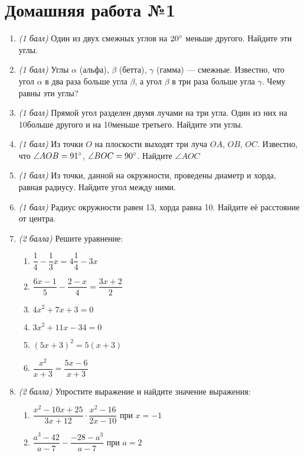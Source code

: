 \documentclass[12pt, a4paper]{article}
\begin{document}
		

\section*{Домашняя работа №1}
\begin{enumerate}
	\item \textit{(1 балл)} Один из двух смежных углов на $20\degree$ меньше другого. Найдите эти углы.
	\item \textit{(1 балл)} Углы $\alpha$ (альфа), $\beta$ (бетта), $\gamma$ (гамма) — смежные. Известно, что угол $\alpha$ в два раза больше угла $\beta$, а угол $\beta$ в три раза больше угла $\gamma$. Чему равны эти углы?
	\item \textit{(1 балл)} Прямой угол разделен двумя лучами на три угла. Один из них на 10\degree больше другого и на 10\degree меньше третьего. Найдите эти углы.
	\item \textit{(1 балл)} Из точки $O$ на плоскости выходят три луча $OA$, $OB$, $OC$. Известно, что $\angle AOB=91\degree$, $\angle BOC=90\degree$. Найдите $\angle AOC$
	\item \textit{(1 балл)} Из точки, данной на окружности, проведены диаметр и хорда, равная радиусу. Найдите угол между ними.
	\item \textit{(1 балл)} Радиус окружности равен 13, хорда равна 10. Найдите её расстояние от центра.
	\item \textit{(2 балла)} Решите уравнение:
	\begin{multicols}{2}
		\begin{enumerate}[label=\asbuk*)]
			\item $\dfrac{1}{4} - \dfrac{1}{3}x = 4\dfrac{1}{4} - 3x$
			\item $\dfrac{6x -1}{5} - \dfrac{2-x}{4} = \dfrac{3x+2}{2}$
			\item $4x^2+7x+3=0$
			\item $3x^2+11x-34=0$
			\item $(5x+3)^2=5(x+3)$
			\item $\dfrac{x^2}{x+3}=\dfrac{5x-6}{x+3}$
		\end{enumerate}
	\end{multicols}
	\item \textit{(2 балла)} Упростите выражение и найдите значение выражения:
	\begin{multicols}{2}
		\begin{enumerate}[label=\asbuk*)]
			\item $\dfrac{x^2-10x+25}{3x+12}\cdot\dfrac{x^2-16}{2x-10}$ при $x=-1$
			\item $\dfrac{a^3-42}{a-7}-\dfrac{-28-a^3}{a-7}$ при $a=2$
		\end{enumerate}
	\end{multicols}
	\end{enumerate}
\end{document}
